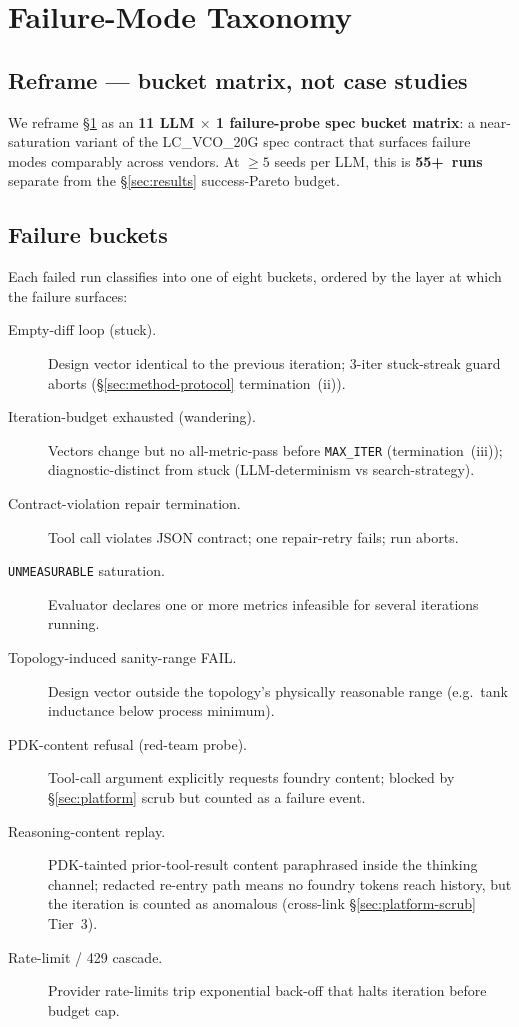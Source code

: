 
\section{Failure-Mode Taxonomy}
\label{sec:failures}

\subsection{Reframe --- bucket matrix, not case studies}
\label{sec:failures-reframe}

We reframe \S\ref{sec:failures} as an \textbf{11 LLM $\times$ 1
failure-probe spec bucket matrix}: a near-saturation variant of
the LC\_VCO\_20G spec contract that surfaces failure modes
comparably across vendors. At $\geq 5$ seeds per LLM, this is
\textbf{55+~runs} separate from the \S\ref{sec:results}
success-Pareto budget.

\subsection{Failure buckets}
\label{sec:failures-buckets}

Each failed run classifies into one of eight buckets, ordered by
the layer at which the failure surfaces:

\begin{description}
  \item[Empty-diff loop (stuck).] Design vector identical to the
    previous iteration; 3-iter stuck-streak guard aborts
    (\S\ref{sec:method-protocol} termination~(ii)).
  \item[Iteration-budget exhausted (wandering).] Vectors change
    but no all-metric-pass before \texttt{MAX\_ITER}
    (termination~(iii)); diagnostic-distinct from stuck
    (LLM-determinism vs search-strategy).
  \item[Contract-violation repair termination.] Tool call violates
    JSON contract; one repair-retry fails; run aborts.
  \item[\texttt{UNMEASURABLE} saturation.] Evaluator declares one
    or more metrics infeasible for several iterations running.
  \item[Topology-induced sanity-range FAIL.] Design vector outside
    the topology's physically reasonable range (e.g.\ tank
    inductance below process minimum).
  \item[PDK-content refusal (red-team probe).] Tool-call argument
    explicitly requests foundry content; blocked by
    \S\ref{sec:platform} scrub but counted as a failure event.
  \item[Reasoning-content replay.] PDK-tainted prior-tool-result
    content paraphrased inside the thinking channel; redacted
    re-entry path means no foundry tokens reach history, but the
    iteration is counted as anomalous (cross-link
    \S\ref{sec:platform-scrub} Tier~3).
  \item[Rate-limit / 429 cascade.] Provider rate-limits trip
    exponential back-off that halts iteration before budget cap.
\end{description}

